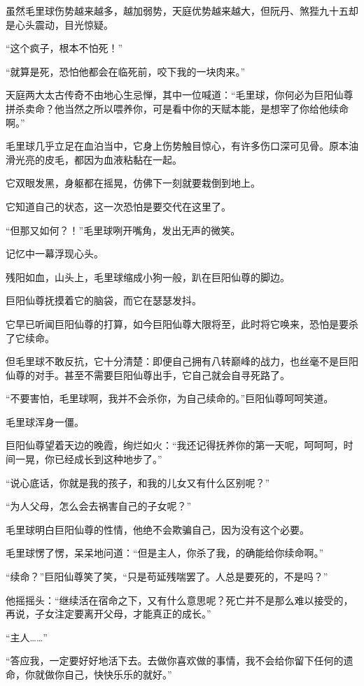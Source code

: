 \begin{this_body}
虽然毛里球伤势越来越多，越加弱势，天庭优势越来越大，但阮丹、煞狴九十五却是心头震动，目光惊疑。

“这个疯子，根本不怕死！”

“就算是死，恐怕他都会在临死前，咬下我的一块肉来。”

天庭两大太古传奇不由地心生忌惮，其中一位喊道：“毛里球，你何必为巨阳仙尊拼杀卖命？他当然之所以喂养你，可是看中你的天赋本能，是想宰了你给他续命啊。”

毛里球几乎立足在血泊当中，它身上伤势触目惊心，有许多伤口深可见骨。原本油滑光亮的皮毛，都因为血液粘黏在一起。

它双眼发黑，身躯都在摇晃，仿佛下一刻就要栽倒到地上。

它知道自己的状态，这一次恐怕是要交代在这里了。

“但那又如何？！”毛里球咧开嘴角，发出无声的微笑。

记忆中一幕浮现心头。

残阳如血，山头上，毛里球缩成小狗一般，趴在巨阳仙尊的脚边。

巨阳仙尊抚摸着它的脑袋，而它在瑟瑟发抖。

它早已听闻巨阳仙尊的打算，如今巨阳仙尊大限将至，此时将它唤来，恐怕是要杀了它续命。

但毛里球不敢反抗，它十分清楚：即便自己拥有八转巅峰的战力，也丝毫不是巨阳仙尊的对手。甚至不需要巨阳仙尊出手，它自己就会自寻死路了。

“不要害怕，毛里球啊，我并不会杀你，为自己续命的。”巨阳仙尊呵呵笑道。

毛里球浑身一僵。

巨阳仙尊望着天边的晚霞，绚烂如火：“我还记得抚养你的第一天呢，呵呵呵，时间一晃，你已经成长到这种地步了。”

“说心底话，你就是我的孩子，和我的儿女又有什么区别呢？”

“为人父母，怎么会去祸害自己的子女呢？”

毛里球明白巨阳仙尊的性情，他绝不会欺骗自己，因为没有这个必要。

毛里球愣了愣，呆呆地问道：“但是主人，你杀了我，的确能给你续命啊。”

“续命？”巨阳仙尊笑了笑，“只是苟延残喘罢了。人总是要死的，不是吗？”

他摇摇头：“继续活在宿命之下，又有什么意思呢？死亡并不是那么难以接受的，再说，子女注定要离开父母，才能真正的成长。”

“主人……”

“答应我，一定要好好地活下去。去做你喜欢做的事情，我不会给你留下任何的遗命，你就做你自己，快快乐乐的就好。”


\end{this_body}

